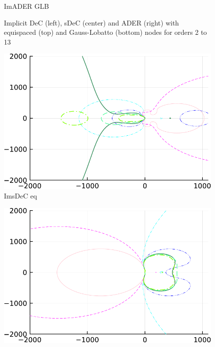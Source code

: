 \begin{figure}
\begin{minipage}[t]{0.32\textwidth}
		ImADER GLB
	\end{minipage}
	\caption{Implicit DeC (left), sDeC (center) and ADER (right) with equispaced (top) and Gauss-Lobatto (bottom) nodes for orders 2 to 13}
	\label{fig: ODEIMDeCADER}
\end{figure}

\begin{figure}
	\centering
	\begin{minipage}[t]{0.33\textwidth}
		\centering
		\includegraphics[width=\textwidth, trim={0 0 0 0}, clip]{pdf/odepics/ImsDeC_eq_ord20-crop.pdf}\\
		ImsDeC eq
	\end{minipage}
	\begin{minipage}[t]{0.33\textwidth}
		\centering
		\includegraphics[width=\textwidth, trim={0 0 0 0}, clip]{pdf/odepics/ImsDeC_GLB_ord20-crop.pdf}\\

\end{minipage}
\end{figure}
